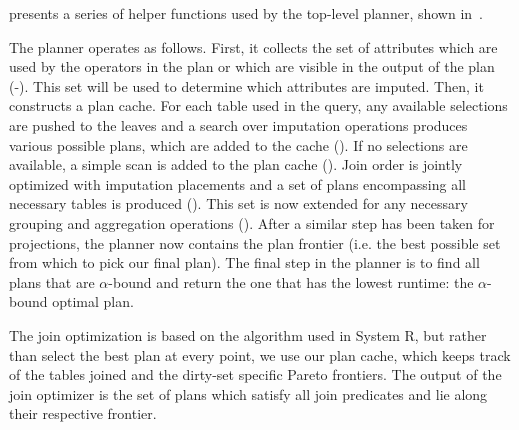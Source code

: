  presents a series of helper functions used by the top-level planner, shown in~.

The planner operates as follows.
First, it collects the set of attributes which are used by the operators in the plan or which are visible in the output of the plan (-).
This set will be used to determine which attributes are imputed.
Then, it constructs a plan cache. For each table used in the query, any available selections are pushed to the leaves and
a search over imputation operations produces various possible plans, which are added to the cache (). If no selections are available, a 
simple scan is added to the plan cache (). Join order is jointly optimized with imputation placements and a set of
plans encompassing all necessary tables is produced (). This set is now extended for any necessary grouping and aggregation
operations (). After a similar step has been taken for projections, the planner now contains the plan frontier (i.e. the
best possible set from which to pick our final plan). The final step in the planner is to find all plans that are
$\alpha$-bound and return the one that has the lowest runtime: the $\alpha$-bound optimal plan.

The join optimization is based on the algorithm used in System R\cite{blasgen1981system},
but rather than select the best plan at every point, we use our plan cache, which keeps track of the tables joined and the dirty-set specific Pareto frontiers.
The output of the join optimizer is the set of plans which satisfy all join predicates and lie along their respective frontier.

\begin{algorithm}

\end{algorithm}

\begin{algorithm}

\end{algorithm}

%

\begin{algorithm}

\end{algorithm}

